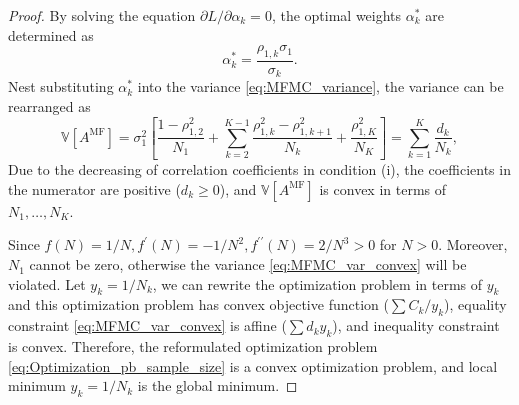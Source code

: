 \begin{proof}

By solving the equation $\partial L/\partial \alpha_k=0$, the optimal weights $\alpha_k^*$ are determined as
%
\[
\alpha_k^*=\frac{\rho_{1,k}\sigma_1}{\sigma_k}.
\]
%
Nest substituting $\alpha_k^*$ into the variance \eqref{eq:MFMC_variance}, the variance can be rearranged as
%
\begin{equation}\label{eq:MFMC_var_convex}
    \mathbb{V}\left[A^{\text{MF}}\right]=\sigma_1^2\left[\frac{1-\rho_{1,2}^2}{N_1} + \sum_{k=2}^{K-1} \frac{\rho_{1,k}^2-\rho_{1,k+1}^2}{N_k} + \frac{\rho_{1,K}^2}{N_K} \right] = \sum_{k=1}^K\frac{d_k}{N_k},
\end{equation}
%
Due to the decreasing of correlation coefficients in condition (i), the coefficients in the numerator are positive ($d_k\ge 0$), and $\mathbb{V}\left[A^{\text{MF}}\right]$ is convex in terms of $N_1,\ldots, N_K$. 

Since $f(N)=1/N, f^\prime (N)=-1/N^2, f^{\prime\prime}(N)=2/N^3>0$ for $N>0$. Moreover, $N_1$ cannot be zero, otherwise the variance \eqref{eq:MFMC_var_convex} will be violated. Let $y_k = 1/N_k$, we can rewrite the optimization problem in terms of $y_k$ and this optimization problem has convex objective function ($\sum C_k/y_k$), equality constraint \eqref{eq:MFMC_var_convex} is affine ($\sum d_k y_k$), and inequality constraint is convex. Therefore, the reformulated optimization problem \eqref{eq:Optimization_pb_sample_size} is a convex optimization problem, and local minimum $y_k = 1/N_k$ is the global minimum.



\end{proof}
